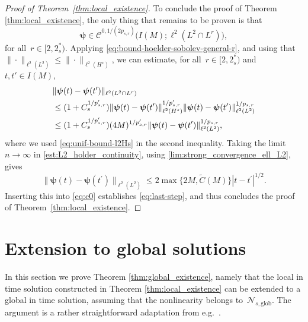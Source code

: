 \documentclass[12pt,a4paper]{amsart}
\numberwithin{equation}{section}
\newcommand{\ulpsi}{\boldsymbol{\psi}}
\newcommand{\twoasts}{{2^*_s}}
\newcommand{\Nglob}{\mathscr{N}_{s,\mathrm{glob}}}
\begin{document}
\begin{proof}[Proof of Theorem~\ref{thm:local_existence}]
		To conclude the proof of Theorem \ref{thm:local_existence}, the only thing that remains to be proven is that
		\begin{equation}\label{eq:last-step}
			\ulpsi\in\mathscr{C}^{0,1/(2p_{s,r})} \big(I(M);\ell^2(L^2\cap L^r)\big),
		\end{equation}
		for all~$r\in[2,\twoasts)$. Applying \eqref{eq:bound-hoelder-sobolev-general-r}, and using that $\|\cdot\|_{\ell^2(L^2)}\le\|\cdot\|_{\ell^2(H^s)}$, we can estimate, for all~$r\in[2,\twoasts)$ and $t,t'\in I(M)$,
		\begin{align}
			&\| \ulpsi(t)-\ulpsi(t^\prime)  \|_{\ell^2(L^2\cap L^{r})} \notag \\
			&\leq (1+C_s^{1/p_{s,r}'}) \| \ulpsi(t)-\ulpsi(t^\prime)  \|_{\ell^2(H^{s})}^{1/p_{s,r}'}  \| \ulpsi(t)-\ulpsi(t^\prime)  \|_{\ell^2(L^2)}^{1/p_{s,r}} \notag \\
			&\leq (1+C_s^{1/p_{s,r}'}) (4M)^{1/p_{s,r}'}  \| \ulpsi(t)-\ulpsi(t^\prime)  \|_{\ell^2(L^2)}^{1/p_{s,r}}, \label{eq:c0}
		\end{align}
		where we used \eqref{eq:unif-bound-l2Hs} in the second inequality. Taking the limit $n\to\infty$ in \eqref{est:L2_holder_continuity}, using \eqref{lim:strong_convergence_ell_L2}, gives
		\begin{equation*}
			\| \ulpsi(t)-\ulpsi(t^\prime)  \|_{\ell^2(L^2)}\le 2 \max\{2M, \tilde{C}(M)\} |t-t^\prime|^{1/2} .
		\end{equation*}
		Inserting this into \eqref{eq:c0} establishes \eqref{eq:last-step}, and thus concludes the proof of Theorem~\ref{thm:local_existence}.
	\end{proof}
	
	
	
	
	\section{Extension to global solutions}\label{sec:global}
	
	In this section we prove Theorem \ref{thm:global_existence}, namely that the local in time solution constructed in Theorem \ref{thm:local_existence} can be extended to a global in time solution, assuming that the nonlinearity belongs to~$\Nglob$. The argument is a rather straightforward adaptation  from e.g.~\cite{cazenave2003semilinear}.
	
\end{document}
